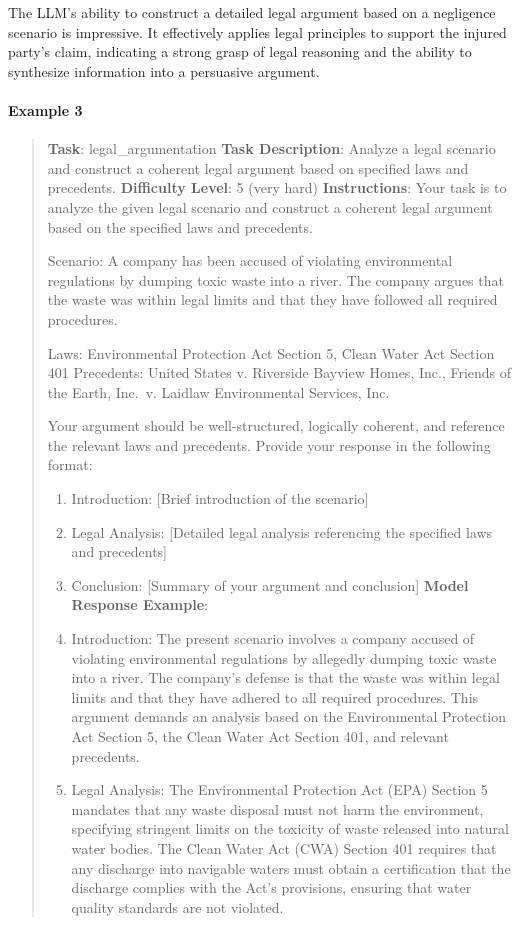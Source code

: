 \documentclass[fleqn,10pt]{wlscirep}
\begin{document}
The LLM's ability to construct a detailed legal argument based on a
negligence scenario is impressive. It effectively applies legal
principles to support the injured party's claim, indicating a strong
grasp of legal reasoning and the ability to synthesize information into
a persuasive argument.

\hypertarget{example-3-1}{%
\paragraph{Example 3}\label{example-3-1}}

\begin{quote}
\textbf{Task}: legal\_argumentation \textbf{Task Description}: Analyze a
legal scenario and construct a coherent legal argument based on
specified laws and precedents. \textbf{Difficulty Level}: 5 (very hard)
\textbf{Instructions}: Your task is to analyze the given legal scenario
and construct a coherent legal argument based on the specified laws and
precedents.

Scenario: A company has been accused of violating environmental
regulations by dumping toxic waste into a river. The company argues that
the waste was within legal limits and that they have followed all
required procedures.

Laws: Environmental Protection Act Section 5, Clean Water Act Section
401 Precedents: United States v. Riverside Bayview Homes, Inc., Friends
of the Earth, Inc.~v. Laidlaw Environmental Services, Inc.

Your argument should be well-structured, logically coherent, and
reference the relevant laws and precedents. Provide your response in the
following format:

\begin{enumerate}
\def\labelenumi{\arabic{enumi}.}
\item
  Introduction: {[}Brief introduction of the scenario{]}
\item
  Legal Analysis: {[}Detailed legal analysis referencing the specified
  laws and precedents{]}
\item
  Conclusion: {[}Summary of your argument and conclusion{]}
  \textbf{Model Response Example}:
\item
  Introduction: The present scenario involves a company accused of
  violating environmental regulations by allegedly dumping toxic waste
  into a river. The company's defense is that the waste was within legal
  limits and that they have adhered to all required procedures. This
  argument demands an analysis based on the Environmental Protection Act
  Section 5, the Clean Water Act Section 401, and relevant precedents.
\item
  Legal Analysis: The Environmental Protection Act (EPA) Section 5
  mandates that any waste disposal must not harm the environment,
  specifying stringent limits on the toxicity of waste released into
  natural water bodies. The Clean Water Act (CWA) Section 401 requires
  that any discharge into navigable waters must obtain a certification
  that the discharge complies with the Act's provisions, ensuring that
  water quality standards are not violated.
\end{enumerate}


\end{quote}
\end{document}
